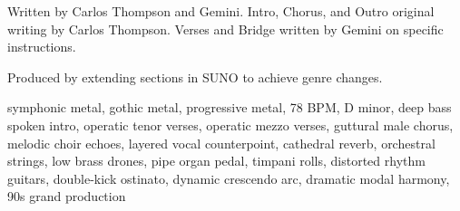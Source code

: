 
\label{sec:fault-in-your-character}
\begin{notes}
Written by Carlos Thompson and Gemini. Intro, Chorus, and Outro original writing by Carlos Thompson. %
Verses and Bridge written by Gemini on specific instructions.

Produced by extending sections in SUNO to achieve genre changes.
\end{notes}
\begin{style}
symphonic metal, gothic metal, progressive metal, 78 BPM, D minor, deep bass spoken intro, operatic tenor verses, operatic mezzo verses, guttural male chorus, melodic choir echoes, layered vocal counterpoint, cathedral reverb, orchestral strings, low brass drones, pipe organ pedal, timpani rolls, distorted rhythm guitars, double-kick ostinato, dynamic crescendo arc, dramatic modal harmony, 90s grand production
\end{style}
